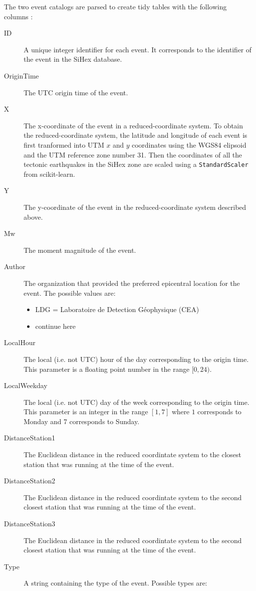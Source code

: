 The two event catalogs are parsed to create tidy tables with the following
columns :
\begin{description}
\item[ID] A unique integer identifier for each event. It corresponds to the
identifier of the event in the SiHex database.
\item[OriginTime] The UTC origin time of the event.
\item[X] The x-coordinate of the event in a reduced-coordinate system. To
obtain the reduced-coordinate system, the latitude and longitude of each event
is first tranformed into UTM $x$ and $y$ coordinates using the WGS84 elipsoid
and the UTM reference zone number 31. Then the coordinates of all the tectonic
earthquakes in the SiHex zone are scaled using a {\tt StandardScaler} from
{scikit-learn}.
\item[Y] The y-coordinate of the event in the reduced-coordinate system
described above.
\item[Mw] The moment magnitude of the event.
\item[Author] The organization that provided the preferred epicentral location
for the event. The possible values are:
\begin{itemize}
\item LDG = Laboratoire de Detection Géophysique (CEA)
\item continue here
\end{itemize}
\item[LocalHour] The local (i.e. not UTC) hour of the day corresponding to the
origin time. This parameter is a floating point number in the range $[0, 24)$.
\item[LocalWeekday] The local (i.e. not UTC) day of the week corresponding to
the origin time. This parameter is an integer in the range $[1, 7]$ where $1$
corresponds to Monday and 7 corresponds to Sunday.
\item[DistanceStation1] The Euclidean distance in the reduced coordintate
system to the closest station that was running at the time of the event. 
\item[DistanceStation2] The Euclidean distance in the reduced coordintate
system to the second closest station that was running at the time of the event. 
\item[DistanceStation3] The Euclidean distance in the reduced coordintate
system to the second closest station that was running at the time of the event. 
\item[Type] A string containing the type of the event. Possible types are:

\end{description}
